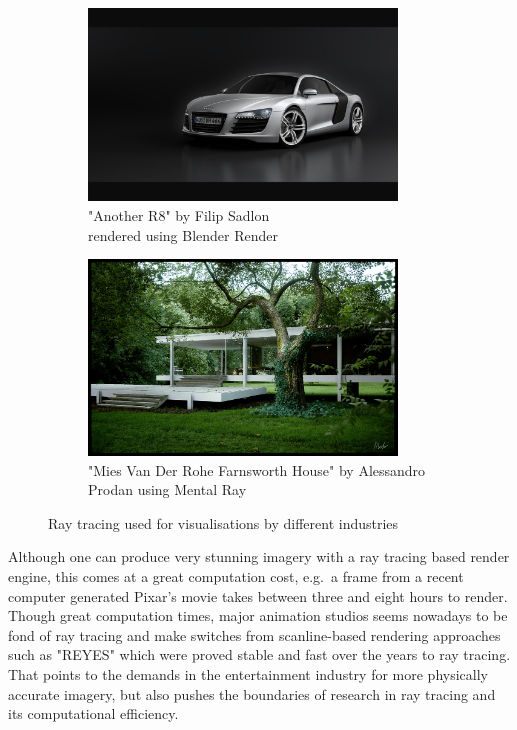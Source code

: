 \documentclass{article}
\begin{document}
\begin{figure}[h]
	\centering
	
	\begin{subfigure}{0.5\textwidth}
		\includegraphics[width=0.9\textwidth]{audi}
		\caption{"Another R8" by Filip Sadlon \\ rendered using Blender Render}
		\label{fig:audi}
	\end{subfigure}%
	\hfill
	\begin{subfigure}{0.5\textwidth}
		\includegraphics[width=0.9\textwidth]{archi_render}
		\caption{"Mies Van Der Rohe Farnsworth House" by Alessandro Prodan using Mental Ray}
		\label{fig:arch}
	\end{subfigure}
	
	\caption{Ray tracing used for visualisations by different industries}
	\label{fig:image2}
\end{figure}



Although one can produce very stunning imagery with a ray tracing based render engine, this  comes at a great computation cost, e.g.\ a frame from a recent computer generated Pixar's movie takes between three and eight hours to render. \cite{pixarRentime} \\
Though great computation times, major animation studios seems nowadays to be fond of ray tracing and make switches from scanline-based rendering approaches such as "REYES" which were proved stable and fast over the years to ray tracing. \cite{pixarSwitch} That points to the demands in the entertainment industry for more physically accurate imagery, but also pushes the boundaries of research in ray tracing and its computational efficiency. \cite{disneyHyperion}
\end{document}
